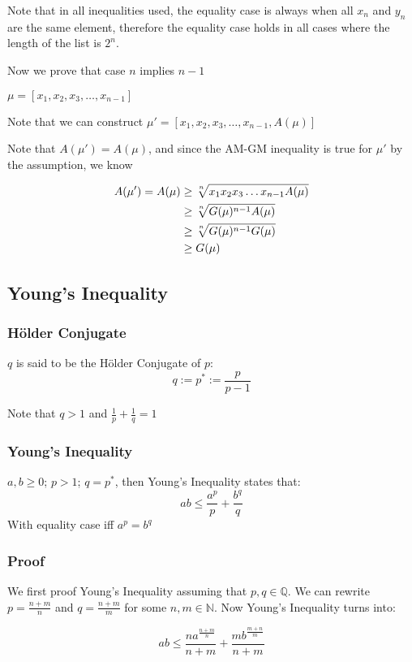 \documentclass[11 pt, twoside]{article}
\begin{document}
Note that in all inequalities used, the equality case is always when all $x_n$
and $y_n$ are the same element, therefore the equality case holds in all cases
where the length of the list is $2^n$.

Now we prove that case $n$ implies $n-1$

$\mu = [x_1, x_2, x_3, \dots, x_{n - 1}]$

Note that we can construct $\mu' = [x_1, x_2, x_3, \dots, x_{n - 1}, A(\mu)]$

Note that $A(\mu') = A(\mu)$, and since the AM-GM inequality is true for $\mu'$
by the assumption, we know

\begin{align*}
A(\mu') = A(\mu) &\geq \sqrt[\uproot{2} n]{x_1x_2x_3\dots x_{n - 1}A(\mu)}\\
&\geq \sqrt[\uproot{2} n]{G(\mu)^{n-1}A(\mu)}\\
&\geq \sqrt[\uproot{2} n]{G(\mu)^{n-1}G(\mu)}\\
&\geq G(\mu)
\end{align*}

\subsection{Young's Inequality}
\subsubsection{H\"{o}lder Conjugate}
$q$ is said to be the H\"{o}lder Conjugate of $p$:
$$q := p^* := \frac{p}{p - 1}$$

Note that $q > 1$ and $\frac{1}{p} + \frac{1}{q} = 1$

\subsubsection{Young's Inequality}
$a, b \geq 0$; $p > 1$; $q = p^*$, then Young's Inequality states that:
$$ab \leq \frac{a^p}{p} + \frac{b^q}{q}$$
With equality case iff $a^p = b^q$

\subsubsection{Proof}
We first proof Young's Inequality assuming that $p, q \in \mathbb{Q}$.
We can rewrite $p = \frac{n + m}{n}$ and $q = \frac{n + m}{m}$ for some $n, m
\in \mathbb{N}$. Now Young's Inequality turns into:

$$ab \leq \frac{na^{\frac{n + m}{n}}}{n + m} + \frac{mb^{\frac{m + n}{m}}}{n + m}$$
\end{document}
